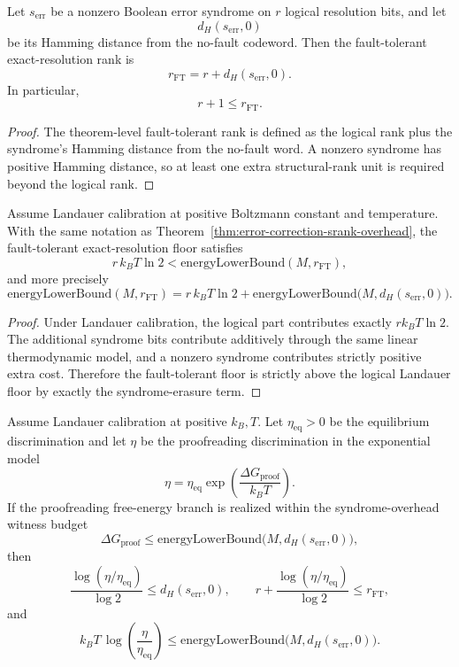 \begin{theorem}\label{thm:error-correction-srank-overhead}
Let $s_{\mathrm{err}}$ be a nonzero Boolean error syndrome on $r$ logical resolution bits, and let
\[
d_H(s_{\mathrm{err}},0)
\]
be its Hamming distance from the no-fault codeword. Then the fault-tolerant exact-resolution rank is
\[
r_{\mathrm{FT}} = r + d_H(s_{\mathrm{err}},0).
\]
In particular,
\[
r + 1 \le r_{\mathrm{FT}}.
\]
\end{theorem}

\begin{proof}
The theorem-level fault-tolerant rank is defined as the logical rank plus the syndrome's Hamming distance from the no-fault word. A nonzero syndrome has positive Hamming distance, so at least one extra structural-rank unit is required beyond the logical rank.
\end{proof}

\begin{theorem}\label{thm:fault-tolerant-landauer-floor}
Assume Landauer calibration at positive Boltzmann constant and temperature. With the same notation as Theorem~\ref{thm:error-correction-srank-overhead}, the fault-tolerant exact-resolution floor satisfies
\[
r\,k_B T\ln 2
<
\mathrm{energyLowerBound}(M,r_{\mathrm{FT}}),
\]
and more precisely
\[
\mathrm{energyLowerBound}(M,r_{\mathrm{FT}})
=
r\,k_B T\ln 2 + \mathrm{energyLowerBound}\!\bigl(M,d_H(s_{\mathrm{err}},0)\bigr).
\]
\end{theorem}

\begin{proof}
Under Landauer calibration, the logical part contributes exactly $r k_B T \ln 2$. The additional syndrome bits contribute additively through the same linear thermodynamic model, and a nonzero syndrome contributes strictly positive extra cost. Therefore the fault-tolerant floor is strictly above the logical Landauer floor by exactly the syndrome-erasure term.
\end{proof}

\begin{theorem}\label{thm:hopfield-ninio-proofreading-overhead}
Assume Landauer calibration at positive $k_B,T$. Let $\eta_{\mathrm{eq}}>0$ be the equilibrium discrimination and let $\eta$ be the proofreading discrimination in the exponential model
\[
\eta
=
\eta_{\mathrm{eq}}\exp\!\left(\frac{\Delta G_{\mathrm{proof}}}{k_B T}\right).
\]
If the proofreading free-energy branch is realized within the syndrome-overhead witness budget
\[
\Delta G_{\mathrm{proof}}
\le
\mathrm{energyLowerBound}\bigl(M,d_H(s_{\mathrm{err}},0)\bigr),
\]
then
\[
\frac{\log(\eta/\eta_{\mathrm{eq}})}{\log 2}
\le d_H(s_{\mathrm{err}},0),
\qquad
r + \frac{\log(\eta/\eta_{\mathrm{eq}})}{\log 2}
\le r_{\mathrm{FT}},
\]
and
\[
k_B T\,\log\!\left(\frac{\eta}{\eta_{\mathrm{eq}}}\right)
\le
\mathrm{energyLowerBound}\bigl(M,d_H(s_{\mathrm{err}},0)\bigr).
\]
\end{theorem}

